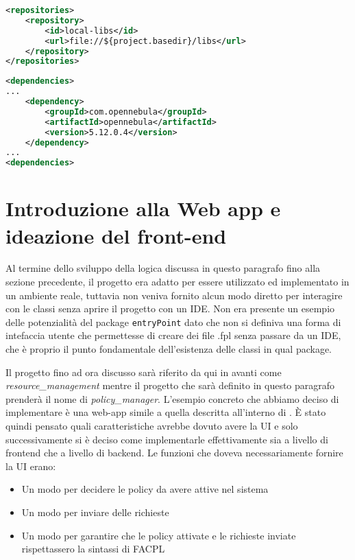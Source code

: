 \begin{lstlisting}[language=XML, xleftmargin=1em, caption=Repository locale, label=code:libsxml]
<repositories>
    <repository>
        <id>local-libs</id>
        <url>file://${project.basedir}/libs</url>
    </repository>
</repositories>
\end{lstlisting}
\begin{lstlisting}[language=XML, xleftmargin=1em, caption=Dipendenza di OpenNebula, label=code:dependencyOpenNebula]
<dependencies>
...
    <dependency>
        <groupId>com.opennebula</groupId>
        <artifactId>opennebula</artifactId>
        <version>5.12.0.4</version>
    </dependency>
...
<dependencies>
\end{lstlisting}

\section{Introduzione alla Web app e ideazione del front-end}
Al termine dello sviluppo della logica discussa in questo paragrafo fino alla sezione precedente, il progetto era adatto per essere utilizzato ed implementato in un ambiente reale, tuttavia non veniva fornito alcun modo diretto per interagire con le classi senza aprire il progetto con un IDE. Non era presente un esempio delle potenzialità del package \texttt{entryPoint} dato che non si definiva una forma di intefaccia utente che permettesse di creare dei file .fpl senza passare da un IDE, che è proprio il punto fondamentale dell'esistenza delle classi in qual package.\par
Il progetto fino ad ora discusso sarà riferito da qui in avanti come \emph{resource\_management} mentre il progetto che sarà definito in questo paragrafo prenderà il nome di \emph{policy\_manager}.
L'esempio concreto che abbiamo deciso di implementare è una web-app simile a quella descritta all'interno di \cite{10.1007/978-3-319-08260-8_6}. È stato quindi pensato quali caratteristiche avrebbe dovuto avere la UI e solo successivamente si è deciso come implementarle effettivamente sia a livello di frontend che a livello di backend. Le funzioni che doveva necessariamente fornire la UI erano:
\begin{itemize}
    \item Un modo per decidere le policy da avere attive nel sistema
    \item Un modo per inviare delle richieste
    \item Un modo per garantire che le policy attivate e le richieste inviate rispettassero la sintassi di FACPL
\end{itemize}
